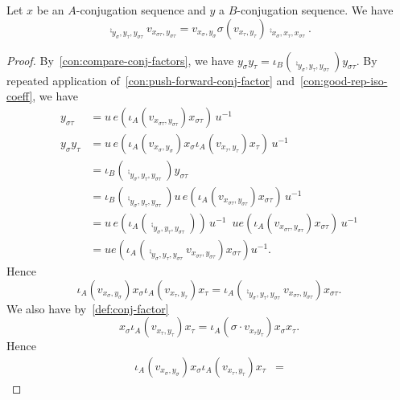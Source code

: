 \begin{lemma}\label{lem:compare-to-2-cocycle-aux}
  Let $x$ be an $A$-conjugation sequence and $y$ a $B$-conjugation sequence.
  We have
  \[
    \comp_{y_{\sigma}, y_{\tau}, y_{\sigma\tau}} v_{x_{\sigma\tau},y_{\sigma\tau}} = v_{x_{\sigma},y_{\sigma}} \sigma\left(v_{x_{\tau},y_{\tau}}\right) \comp_{x_{\sigma},x_{\tau},x_{\sigma\tau}}.
  \]
  \leanok
\end{lemma}
\begin{proof}
  By~\cref{con:compare-conj-factors}, we have $y_{\sigma}y_{\tau} = \iota_{B}\left(\comp_{y_{\sigma},y_{\tau},y_{\sigma\tau}}\right)y_{\sigma\tau}$.
  By repeated application of~\cref{con:push-forward-conj-factor} and~\cref{con:good-rep-iso-coeff}, we have
  \[
    \begin{aligned}
      y_{\sigma\tau}&= u\,e\left(\iota_{A}\left(v_{x_{\sigma\tau},y_{\sigma\tau}}\right)x_{\sigma\tau}\right)\,u^{-1}\\
      y_{\sigma}y_{\tau} &= u\,e\left(\iota_{A}\left(v_{x_{\sigma},y_{\sigma}}\right)x_{\sigma}\iota_{A}\left(v_{x_{\tau},y_{\tau}}\right)x_{\tau}\right)\,u^{-1}\\
                    &= \iota_{B}\left(\comp_{y_{\sigma},y_{\tau},y_{\sigma\tau}}\right)y_{\sigma\tau}\\
                    &= \iota_{B}\left(\comp_{y_{\sigma},y_{\tau},y_{\sigma\tau}}\right)u\,e\left(\iota_{A}\left(v_{x_{\sigma\tau},y_{\sigma\tau}}\right)x_{\sigma\tau}\right)\,u^{-1}\\
                    &= u\,e\left(\iota_{A}\left(\comp_{y_{\sigma},y_{\tau},y_{\sigma\tau}}\right)\right)\,u^{-1}\,\,\,ue\left(\iota_{A}\left(v_{x_{\sigma\tau},y_{\sigma\tau}}\right)x_{\sigma\tau}\right)\,u^{-1}\\
      &= ue\left(\iota_{A}\left(\comp_{y_{\sigma},y_{\tau},y_{\sigma\tau}}v_{x_{\sigma\tau},y_{\sigma\tau}}\right)x_{\sigma\tau}\right)u^{-1}.
    \end{aligned}
  \]
  Hence
  \[
    \iota_{A}\left(v_{x_{\sigma},y_{\sigma}}\right)x_{\sigma}\iota_{A}\left(v_{x_{\tau},y_{\tau}}\right)x_{\tau} = \iota_{A}\left(\comp_{y_{\sigma},y_{\tau},y_{\sigma\tau}}v_{x_{\sigma\tau},y_{\sigma\tau}}\right)x_{\sigma\tau}.
  \]
  We also have by~\cref{def:conj-factor}
  \[
    x_{\sigma} \iota_{A}\left(v_{x_{\tau},y_{\tau}}\right) x_{\tau} =
    \iota_{A}\left(\sigma\cdot v_{x_{\tau}y_{\tau}}\right) x_{\sigma}x_{\tau}.
  \]
  Hence
  \[
    \begin{aligned}    \iota_{A}\left(v_{x_{\sigma},y_{\sigma}}\right)x_{\sigma}\iota_{A}\left(v_{x_{\tau},y_{\tau}}\right)x_{\tau} &=

\end{aligned}\]
\end{proof}
